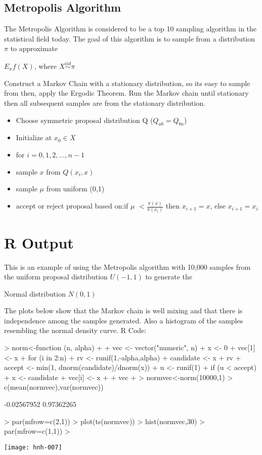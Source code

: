 \documentclass[11pt,a4paper]{article}
\theoremstyle{plain}
\begin{document}
\subsection{\bf Metropolis Algorithm}
The Metropolis Algorithm is considered to be a top 10 sampling algorithm in the statistical field today.
The goal of this algorithm is to sample from a distribution $\pi$ to approximate
\begin{center}$E_{\pi}f(X)$, where $X\overset{iid}\sim \pi$
\end{center}
Construct a Markov Chain with a stationary distribution, so its easy to sample from then, apply the Ergodic Theorem. Run the Markov chain until stationary then all subsequent samples are from the stationary distribution.
\begin{itemize}
  \item Choose symmetric proposal distribution Q ($Q_{ab}=Q_{ba}$)
  \item Initialize at $x_0\in X$
  \item for $i=0,1,2,...,n-1$
  \item sample $x$ from $Q(x_i,x)$ 
  \item sample $\mu$ from uniform (0,1)
  \item accept or reject proposal based on:if $\mu$ $<\frac{\pi(x)}{\pi(x_i)}$ then $x_{i+1}=x$, else $x_{i+1}=x_i$
\end{itemize}



\newpage
\section*{R Output}
This is an example of using the Metropolis algorithm with 10,000 samples from the uniform proposal distribution $U(-1,1)$ to generate the
\begin{center}Normal distribution $N(0,1)$
\end{center}
The plots below show that the Markov chain is well mixing and that there is independence among the samples generated. Also a histogram of the samples resembling the normal density curve.
\newline R Code:
\begin{Schunk}
\begin{Sinput}
> norm<-function (n, alpha) 
+ {
+   vec <- vector("numeric", n)
+   x <- 0
+   vec[1] <- x
+   for (i in 2:n) {
+     rv <- runif(1,-alpha,alpha)
+     candidate <- x + rv
+     accept <- min(1, dnorm(candidate)/dnorm(x))
+     u <- runif(1)
+     if (u < accept) 
+       x <- candidate
+     vec[i] <- x
+   }
+   vec
+ }
> normvec<-norm(10000,1)
> c(mean(normvec),var(normvec))
\end{Sinput}
\begin{Soutput}
[1] -0.02567952  0.97362265
\end{Soutput}
\begin{Sinput}
> par(mfrow=c(2,1))
> plot(ts(normvec))
> hist(normvec,30)
> par(mfrow=c(1,1))
> 
\end{Sinput}
\end{Schunk}
\texttt{[image: hnh-007]}
\end{document}
